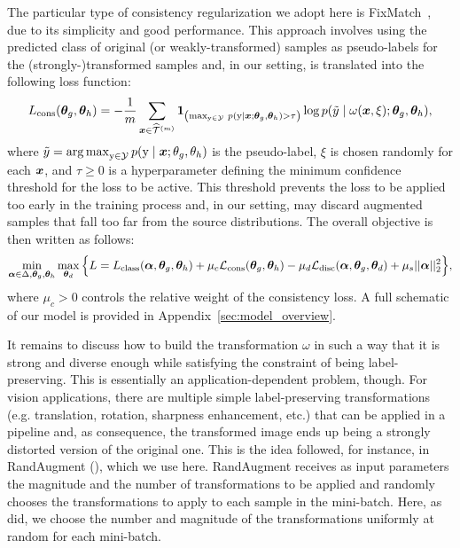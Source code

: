 The particular type of consistency regularization we adopt here is FixMatch~\citep{Sohn2020}, due to its simplicity and good performance. This approach involves using the predicted class of original (or weakly-transformed) samples as pseudo-labels for the (strongly-)transformed samples and, in our setting, is translated into the following loss function:
\begin{equation}
L_{\text{cons}}({\bm{\theta}}_g, {\bm{\theta}}_h) = -\frac{1}{m}\sum_{{\bm{x}} \in \widehat{{\mathcal{T}}}^{(m)}} \bm{1}_{\left(\max_{{\textnormal{y}} \in {\mathcal{Y}}}\, p({\textnormal{y}} \mid {\bm{x}}; {\bm{\theta}}_g, {\bm{\theta}}_h) > \tau \right)} \log p(\tilde{y} \mid \omega({\bm{x}}, \xi); {\bm{\theta}}_g, {\bm{\theta}}_h),
\end{equation}
where $\tilde{y} = \operatorname*{arg\,max}_{{\textnormal{y}} \in {\mathcal{Y}}} p({\textnormal{y}} \mid {\bm{x}}; \theta_g, \theta_h)$ is the pseudo-label, $\xi$ is chosen randomly for each ${\bm{x}}$, and $\tau \geq 0$ is a hyperparameter defining the minimum confidence threshold for the loss to be active. This threshold prevents the loss to be applied too early in the training process and, in our setting, may discard augmented samples that fall too far from the source distributions. The overall objective is then written as follows:
\begin{equation}
\min_{{\bm{\alpha}} \in \Delta, {\bm{\theta}}_g, {\bm{\theta}}_h}\max_{{\bm{\theta}}_d} \Big\{ L = L_\text{class}({\bm{\alpha}}, {\bm{\theta}}_g, {\bm{\theta}}_h) + \mu_c {\mathcal{L}}_\text{cons}({\bm{\theta}}_g, {\bm{\theta}}_h) - \mu_d {\mathcal{L}}_\text{disc}({\bm{\alpha}}, {\bm{\theta}}_g, {\bm{\theta}}_d) + \mu_s ||{\bm{\alpha}}||_2^2 \Big\}, 
\end{equation}
where $\mu_c > 0$ controls the relative weight of the consistency loss. A full schematic of our model is provided in Appendix~\ref{sec:model_overview}.

It remains to discuss how to build the transformation $\omega$ in such a way that it is strong and diverse enough while satisfying the constraint of being label-preserving. This is essentially an application-dependent problem, though. For vision applications, there are multiple simple label-preserving transformations (e.g. translation, rotation, sharpness enhancement, etc.) that can be applied in a pipeline and, as consequence, the transformed image ends up being a strongly distorted version of the original one. This is the idea followed, for instance, in RandAugment (\citet{Cubuk2019}), which we use here. RandAugment receives as input parameters the magnitude and the number of transformations to be applied and randomly chooses the transformations to apply to each sample in the mini-batch. Here, as \citet{Sohn2020} did, we choose the number and magnitude of the transformations uniformly at random for each mini-batch.

